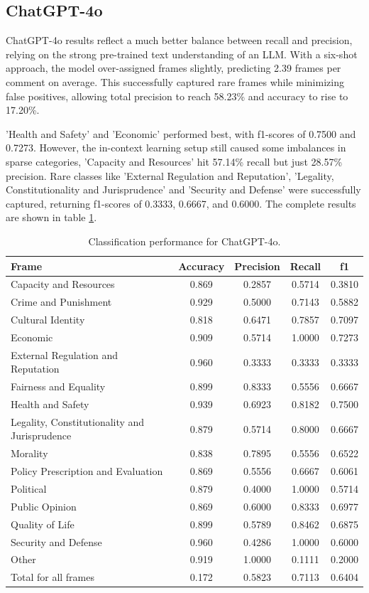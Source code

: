 \documentclass[
10pt, %
a4paper, %
oneside, %
headinclude,footinclude, %
] {book}%
\begin{document}
\subsection{ChatGPT-4o}
ChatGPT-4o results reflect a much better balance between recall and precision, relying on the strong pre-trained text understanding of an LLM. With a six-shot approach, the model over-assigned frames slightly, predicting 2.39 frames per comment on average. This successfully captured rare frames while minimizing false positives, allowing total precision to reach 58.23\% and accuracy to rise to 17.20\%.

'Health and Safety' and 'Economic' performed best, with f1-scores of 0.7500 and 0.7273. However, the in-context learning setup still caused some imbalances in sparse categories, 'Capacity and Resources' hit 57.14\% recall but just 28.57\% precision. Rare classes like 'External Regulation and Reputation', 'Legality, Constitutionality and Jurisprudence' and 'Security and Defense' were successfully captured, returning f1-scores of 0.3333, 0.6667, and 0.6000. The complete results are shown in table \ref{tab:gpt_classification}.

 
\begin{table}[htbp]
\small
\centering
\begin{tabular}{|l|c|c|c|c|}
\hline
\textbf{Frame} & \textbf{Accuracy} & \textbf{Precision} & \textbf{Recall} & \textbf{f1} \\
\hline
Capacity and Resources & 0.869 & 0.2857 & 0.5714 & 0.3810 \\\hline
Crime and Punishment & 0.929 & 0.5000 & 0.7143 & 0.5882 \\\hline
Cultural Identity & 0.818 & 0.6471 & 0.7857 & 0.7097 \\\hline
Economic & 0.909 & 0.5714 & 1.0000 & 0.7273 \\\hline
External Regulation and Reputation & 0.960 & 0.3333 & 0.3333 & 0.3333 \\\hline
Fairness and Equality & 0.899 & 0.8333 & 0.5556 & 0.6667 \\\hline
Health and Safety & 0.939 & 0.6923 & 0.8182 & 0.7500 \\\hline
Legality, Constitutionality and Jurisprudence & 0.879 & 0.5714 & 0.8000 & 0.6667 \\\hline
Morality & 0.838 & 0.7895 & 0.5556 & 0.6522 \\\hline
Policy Prescription and Evaluation & 0.869 & 0.5556 & 0.6667 & 0.6061 \\\hline
Political & 0.879 & 0.4000 & 1.0000 & 0.5714 \\\hline
Public Opinion & 0.869 & 0.6000 & 0.8333 & 0.6977 \\\hline
Quality of Life & 0.899 & 0.5789 & 0.8462 & 0.6875 \\\hline
Security and Defense & 0.960 & 0.4286 & 1.0000 & 0.6000 \\
\hline
Other & 0.919 & 1.0000 & 0.1111 & 0.2000 \\\hline
Total for all frames & 0.172 & 0.5823 & 0.7113 & 0.6404 \\
\hline
\end{tabular}
\caption{Classification performance for ChatGPT-4o.}
\label{tab:gpt_classification}
\end{table}
\end{document}
